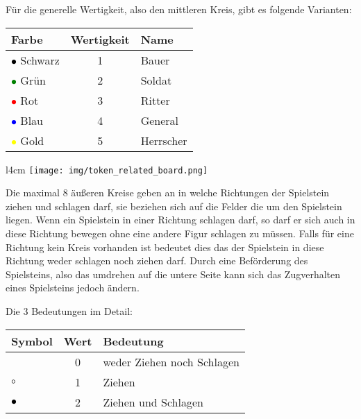 \documentclass{article}
\begin{document}
	\begin{flushleft}
	
	Für die generelle Wertigkeit, also den mittleren Kreis, gibt es folgende Varianten:
	
	\vspace{0.2cm}
	
	\begin{tabular}{lcl}
	\hline
	Farbe & Wertigkeit & Name \\ \hline 
	\textcolor{black}{$\bullet$} Schwarz 	& 1 & Bauer \\ 
	\textcolor{green}{$\bullet$} Grün	& 2 & Soldat \\ 
	\textcolor{red}{$\bullet$} 	Rot	& 3 & Ritter \\ 
	\textcolor{blue}{$\bullet$} Blau	& 4 & General \\ 
	\textcolor{yellow}{$\bullet$} Gold	& 5 & Herrscher \\ 
	\end{tabular}

	\end{flushleft}
	
	\vspace{0.2cm}
	
	\begin{wrapfigure}{l}{4cm}
	\centering
	\texttt{[image: img/token\_related\_board.png]}
	\end{wrapfigure}
	
	Die maximal 8 äußeren Kreise geben an in welche Richtungen der Spielstein ziehen und 
	schlagen darf, sie beziehen sich auf die Felder die um den Spielstein liegen.
	Wenn ein Spielstein in einer Richtung schlagen darf, so darf er sich auch in 
	diese Richtung bewegen ohne eine andere Figur schlagen zu müssen. Falls für eine
	Richtung kein Kreis vorhanden ist bedeutet dies das der Spielstein in diese Richtung
	weder schlagen noch ziehen darf. Durch eine Beförderung des Spielsteins, also das umdrehen
	auf die untere Seite kann sich das Zugverhalten eines Spielsteins jedoch ändern.

	\vspace{0.2cm}
	
	\begin{flushleft}
	Die 3 Bedeutungen im Detail: 
	\end{flushleft}
	
	\vspace{0.2cm}
	
	\begin{tabular}{lcl}
	\hline
	Symbol & Wert & Bedeutung  \\  \hline
									& 0 & weder Ziehen noch Schlagen \\
	\textcolor{black}{$\circ$}		& 1 & Ziehen \\ 
	\textcolor{black}{$\bullet$} 	& 2 & Ziehen und Schlagen  \\ 
	\end{tabular}
	 
\end{document}
